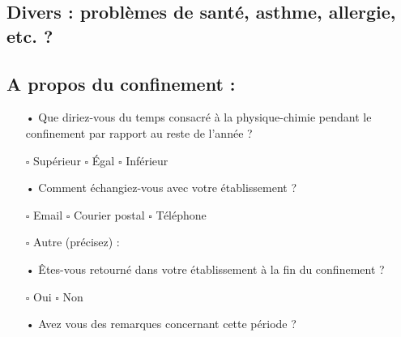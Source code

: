 \documentclass[12pt,a4paper]{article}
\begin{document}
\subsection*{Divers : problèmes de santé, asthme, allergie, etc. ?}
\vfill

\subsection*{A propos du confinement :}
\begin{itemize}
\item[•] Que diriez-vous du temps consacré à la physique-chimie pendant le confinement par rapport au reste de l'année ?

\hspace{50pt} $\square$ Supérieur \hspace{50pt} $\square$ Égal \hspace{50pt} $\square$ Inférieur
\item[•] Comment échangiez-vous avec  votre établissement ?

\hspace{50pt} $\square$ Email \hspace{50pt} $\square$ Courier postal \hspace{50pt} $\square$ Téléphone

\hspace{50pt} $\square$ Autre (précisez) :
\item[•] Êtes-vous retourné dans votre établissement à la fin du confinement ?

\hspace{50pt} $\square$ Oui \hspace{50pt} $\square$ Non
\item[•] Avez vous des remarques concernant cette période ?
\end{itemize}
\vfill
\end{document}
